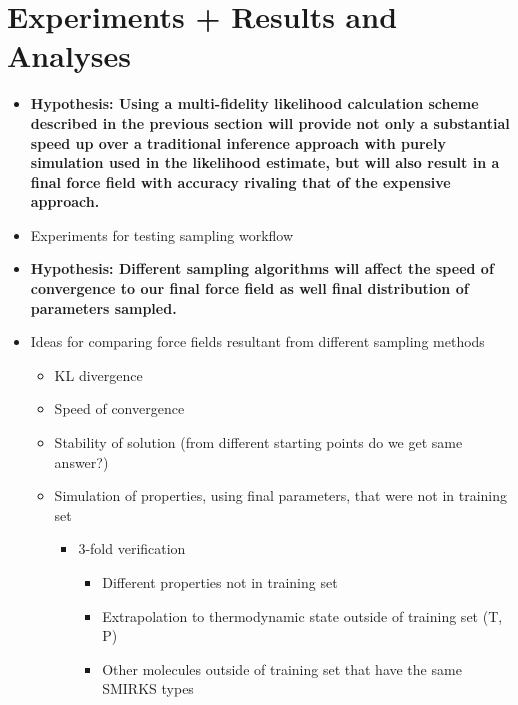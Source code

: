 \documentclass[aps,pre,nofootinbib,superscriptaddress,linenumbers,10pt, draft,tightenlines]{revtex4-1}
\begin{document}
\section{Experiments + Results and Analyses}
\begin{itemize}
	\item \textbf{Hypothesis: Using a multi-fidelity likelihood calculation scheme described in the previous section will provide not only a substantial
	      speed up over a traditional inference approach with purely simulation used in the likelihood estimate, but 
	      will also result in a final force field with accuracy rivaling that of the expensive approach.}
	\item Experiments for testing sampling workflow
    \item \textbf{Hypothesis: Different sampling algorithms will affect the speed of convergence to our final force field as well final distribution of parameters
          sampled.}
    \item Ideas for comparing force fields resultant from different sampling methods
    \begin{itemize}
    	\item KL divergence
    	\item Speed of convergence
    	\item Stability of solution (from different starting points do we get same answer?) 
    	\item Simulation of properties, using final parameters, that 
    	      were not in training set
    	\begin{itemize}
    		\item 3-fold verification
    		\begin{itemize}
    			\item Different properties not in training set
    			\item Extrapolation to thermodynamic state outside of training set (T, P)
    			\item Other molecules outside of training set that have the same SMIRKS types
    		\end{itemize}    		
    	\end{itemize} 
    \end{itemize}
\end{itemize}
\end{document}
